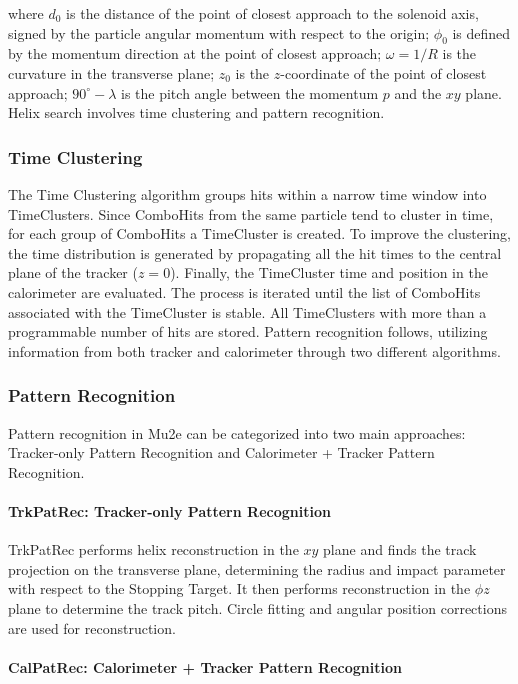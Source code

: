 where $d_0$ is the distance of the point of closest approach to the solenoid axis, 
signed by the particle angular momentum with respect to the origin; $\phi_0$ is 
defined by the momentum direction at the point of closest approach; $\omega = 1/R$ 
is the curvature in the transverse plane; $z_0$ is the $z$-coordinate of the point of 
closest approach; $90^\circ - \lambda$ is the pitch angle between the momentum $p$ and 
the $xy$ plane. Helix search involves time clustering and pattern recognition.

\subsubsection{Time Clustering}

The Time Clustering algorithm groups hits within a narrow time window into TimeClusters. 
Since ComboHits from the same particle tend to cluster in time, for each group of ComboHits a 
TimeCluster is created. To improve the clustering, the time distribution is generated by 
propagating all the hit times to the central plane of the tracker ($z=0$). Finally, the 
TimeCluster time and position in the calorimeter are evaluated. The process is iterated 
until the list of ComboHits associated with the TimeCluster is stable. All TimeClusters with 
more than a programmable number of hits are stored. Pattern recognition follows, utilizing 
information from both tracker and calorimeter through two different algorithms.
\subsubsection{Pattern Recognition}

Pattern recognition in Mu2e can be categorized into two main approaches: 
Tracker-only Pattern Recognition and Calorimeter + Tracker Pattern Recognition.

\paragraph{TrkPatRec: Tracker-only Pattern Recognition}

TrkPatRec performs helix reconstruction in the $xy$ plane and finds the 
track projection on the transverse plane, determining the radius and impact 
parameter with respect to the Stopping Target. It then performs reconstruction 
in the $\phi z$ plane to determine the track pitch. Circle fitting and angular 
position corrections are used for reconstruction.

\paragraph{CalPatRec: Calorimeter + Tracker Pattern Recognition}

